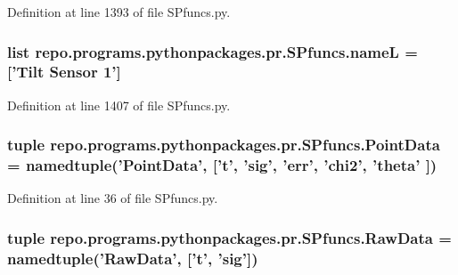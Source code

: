 Definition at line 1393 of file S\-Pfuncs.\-py.

\hypertarget{namespacerepo_1_1programs_1_1pythonpackages_1_1pr_1_1SPfuncs_a7fe775d9cf2e94f97127d699a8b92579}{
\subsubsection[{name\-L}]{\setlength{\rightskip}{0pt plus 5cm}list repo.\-programs.\-pythonpackages.\-pr.\-S\-Pfuncs.\-name\-L = \mbox{[}'Tilt Sensor 1'\mbox{]}}}\label{namespacerepo_1_1programs_1_1pythonpackages_1_1pr_1_1SPfuncs_a7fe775d9cf2e94f97127d699a8b92579}


Definition at line 1407 of file S\-Pfuncs.\-py.

\hypertarget{namespacerepo_1_1programs_1_1pythonpackages_1_1pr_1_1SPfuncs_a1ffb0a48d6d36a1260a65e82c4604ce2}{
\subsubsection[{Point\-Data}]{\setlength{\rightskip}{0pt plus 5cm}tuple repo.\-programs.\-pythonpackages.\-pr.\-S\-Pfuncs.\-Point\-Data = namedtuple('Point\-Data', \mbox{[}'{\bf t}', 'sig', 'err', 'chi2', 'theta' \mbox{]})}}\label{namespacerepo_1_1programs_1_1pythonpackages_1_1pr_1_1SPfuncs_a1ffb0a48d6d36a1260a65e82c4604ce2}


Definition at line 36 of file S\-Pfuncs.\-py.

\hypertarget{namespacerepo_1_1programs_1_1pythonpackages_1_1pr_1_1SPfuncs_a29a04cecefb141502380f4e43bc1d06d}{
\subsubsection[{Raw\-Data}]{\setlength{\rightskip}{0pt plus 5cm}tuple repo.\-programs.\-pythonpackages.\-pr.\-S\-Pfuncs.\-Raw\-Data = namedtuple('Raw\-Data', \mbox{[}'{\bf t}', 'sig'\mbox{]})}}\label{namespacerepo_1_1programs_1_1pythonpackages_1_1pr_1_1SPfuncs_a29a04cecefb141502380f4e43bc1d06d}


